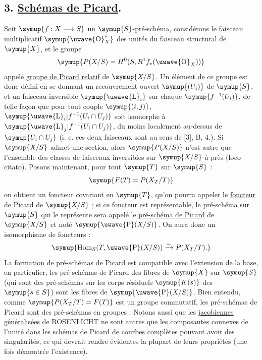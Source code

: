 \subsection*{\textnormal{3. \uline{Schémas de Picard}.}}

Soit $\symup{f:X\longrightarrow S}$ un $\symup{S}$-pré-schéma, considérons le faisceau
multiplicatif $\symup{\text{\uwave{O}}_X^*}$ des unités du faisceau structural de $\symup{X}$, et le
groupe
\[
  \symup{P(X/S)=H^0(S,R^1f_*(\text{\uwave{O}}_X))}
\]
appelé \uline{groupe de Picard relatif} de $\symup{X/S}$. Un élément de ce groupe est donc
défini en se donnant un recouvrement ouvert $\symup{(U_i)}$ de $\symup{S}$, et un faisceau
inversible $\symup{\text{\uwave{L}}_i}$ sur chaque $\symup{f^{-1}(U_i)}$, de telle façon que pour tout couple
$\symup{(i,j)}$, $\symup{\text{\uwave{L}}_i|f^{-1}(U_i\cap U_j)}$ soit isomorphe à
$\symup{\text{\uwave{L}}_j|f^{-1}(U_i\cap U_j)}$, du moins localement au-dessus de $\symup{U_i\cap U_j}$
(i. e. ces deux faisceaux sont  au sens de [3], B, 4.). Si $\symup{X/S}$
admet une section, alors $\symup{P(X/S)}$ n'est autre que l'ensemble des classes de
faisceaux inversibles sur $\symup{X/S}$ à  près (loco citato). Posons
maintenant, pour tout $\symup{T}$ sur $\symup{S}$ :
\[
  \symup{F(T)=P(X_T/T)}
\]
on obtient un foncteur covariant en $\symup{T}$, qu'on pourra appeler le \uline{foncteur de
Picard} de $\symup{X/S}$ ; si ce foncteur est représentable, le pré-schéma sur $\symup{S}$ qui
le représente sera appelé le \uline{pré-schéma de Picard} de $\symup{X/S}$ et noté
$\symup{\text{\uwave{P}}(X/S)}$. On aura donc un isomorphisme de foncteurs :
\[
  \symup{\operatorname{Hom}_S(T,\text{\uwave{P}}(X/S))
  \xrightarrow{\sim}P(X_T/T).}
\]
La formation de pré-schémas de Picard est compatible avec l'extension de la
base, en particulier, les pré-schémas de Picard des fibres de $\symup{X}$ sur $\symup{S}$ (qui
sont des pré-schémas sur les corps résiduels $\symup{K(s)}$ des $\symup{s\in S}$) sont les
fibres
de $\symup{\text{\uwave{P}}(X/S)}$. Bien entendu, comme $\symup{P(X_T/T)=F(T)}$ est un
groupe commutatif, les pré-schémas de Picard sont des pré-schémas en groupes :
Notons aussi que les \uline{jacobiennes généralisées} de ROSENLICHT ne sont autres que
les composantes connexes de l'unité dans les schémas de Picard de courbes
complètes pouvant avoir des singularités, ce qui devrait rendre évidentes la
plupart de leurs propriétés (une fois démontrée l'existence).

